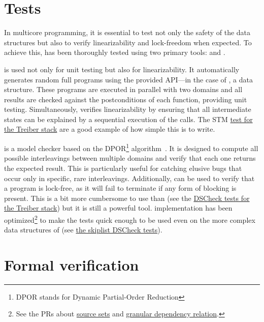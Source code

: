 \documentclass[a4paper, 11pt]{article}
\begin{document}
\section{Tests}

In multicore programming, it is essential to test not only the safety of the data structures but also to verify linearizability and lock-freedom when expected.
To achieve this, \Saturn has been thoroughly tested using two primary tools: \DSCheck and \STM.

\STM is used not only for unit testing but also for linearizability.
It automatically generates random full programs using the provided API---in the case of \Saturn, a data structure.
These programs are executed in parallel with two domains and all results are checked against the postconditions of each function, providing unit testing.
Simultaneously, \STM verifies linearizability by ensuring that all intermediate states can be explained by a sequential execution of the calls. The STM \href{https://github.com/ocaml-multicore/saturn/blob/main/test/treiber_stack/stm_treiber_stack.ml}{test for the Treiber stack} are a good example of how simple this is to write.

\DSCheck is a model checker based on the DPOR\footnote[3]{DPOR stands for Dynamic Partial-Order Reduction} algorithm~\cite{dpor05}.
It is designed to compute all possible interleavings between multiple domains and verify that each one returns the expected result.
This is particularly useful for catching elusive bugs that occur only in specific, rare interleavings.
Additionally, \DSCheck can be used to verify that a program is lock-free, as it will fail to terminate if any form of blocking is present. This is a bit more cumbersome to use than \STM (see the \href{https://github.com/ocaml-multicore/saturn/blob/main/test/treiber_stack/treiber_stack_dscheck.ml}{DSCheck tests for the Treiber stack}) but it is still a powerful tool. \DSCheck implementation has been optimized\footnote[4]{See the PRs about \href{https://github.com/ocaml-multicore/dscheck/pull/18}{source sets} and \href{https://github.com/ocaml-multicore/dscheck/pull/22}{granular dependency relation}.} to make the tests quick enough to be used even on the more complex data structures of \Saturn (see \href{https://github.com/ocaml-multicore/saturn/blob/main/test/skiplist/stm_skiplist.ml}{the skiplist DSCheck tests}).

\section{Formal verification}
\end{document}
